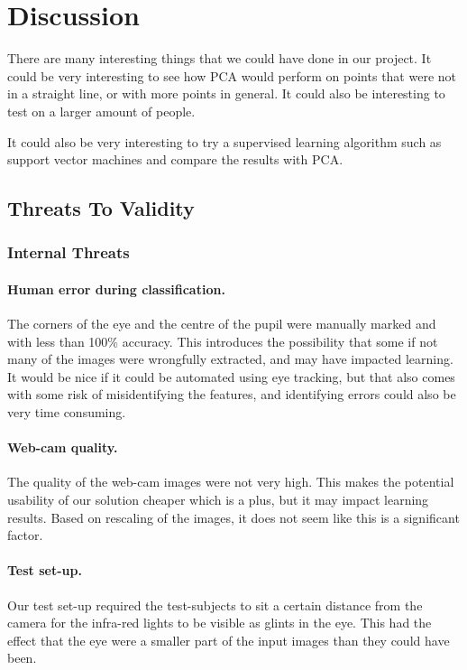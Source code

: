 \section{Discussion}
There are many interesting things that we could have done in our project.
It could be very interesting to see how PCA would perform on points that were not in a straight line, or with more points in general.
It could also be interesting to test on a larger amount of people.

It could also be very interesting to try a supervised learning algorithm such as support vector machines and compare the results with PCA.

\subsection{Threats To Validity}
\subsubsection{Internal Threats}
\paragraph{Human error during classification.}
The corners of the eye and the centre of the pupil were manually marked and with less than 100\% accuracy.
This introduces the possibility that some if not many of the images were wrongfully extracted, and may have impacted learning.
It would be nice if it could be automated using eye tracking, but that also comes with some risk of misidentifying the features, and identifying errors could also be very time consuming.

\paragraph{Web-cam quality.}
The quality of the web-cam images were not very high.
This makes the potential usability of our solution cheaper which is a plus, but it may impact learning results.
Based on rescaling of the images, it does not seem like this is a significant factor.

\paragraph{Test set-up.}
Our test set-up required the test-subjects to sit a certain distance from the camera for the infra-red lights to be visible as glints in the eye.
This had the effect that the eye were a smaller part of the input images than they could have been.

